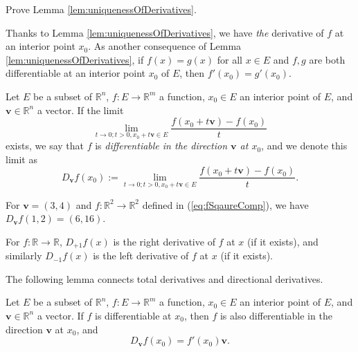 \begin{exc}
  Prove Lemma \ref{lem:uniquenessOfDerivatives}.
\end{exc}

\begin{rem}
  Thanks to Lemma \ref{lem:uniquenessOfDerivatives},
  we have \emph{the} derivative of $f$ at an interior point $x_0$.
  As another consequence of Lemma \ref{lem:uniquenessOfDerivatives},
  if $f(x)=g(x)$ for all $x\in E$
  and $f,g$ are both differentiable at an interior point $x_0$ of $E$,
  then $f'(x_0)=g'(x_0)$.
\end{rem}

\begin{defn}
  \label{def:directionalDerivative}
  Let $E$ be a subset of $\mathbb{R}^n$,
  $f: E\rightarrow \mathbb{R}^m$ a function,
  $x_0\in E$ an interior point of $E$,
  and $\mathbf{v}\in \mathbb{R}^n$ a vector.
  If the limit
  \begin{displaymath}
    \lim_{t\rightarrow 0; t>0, x_0+t\mathbf{v}\in E} \frac{f(x_0+t\mathbf{v}) - f(x_0)}{t}
  \end{displaymath}
  exists, we say that $f$ is \emph{differentiable in the direction $\mathbf{v}$
    at $x_0$},
  and we denote this limit as
  \begin{equation}
    \label{eq:directionalDerivative}
    D_\mathbf{v} f(x_0) := \lim_{t\rightarrow 0; t>0, x_0+t\mathbf{v}\in E}
    \frac{f(x_0+t\mathbf{v}) - f(x_0)}{t}.
  \end{equation}
\end{defn}

\begin{exm}
  For $\mathbf{v}=(3,4)$ and $f: \mathbb{R}^2\rightarrow\mathbb{R}^2$ defined in
  (\ref{eq:fSqaureComp}),
  we have $D_{\mathbf{v}}f(1,2)=(6,16)$.
\end{exm}

\begin{exm}
  For $f: \mathbb{R}\rightarrow\mathbb{R}$,
  $D_{+1} f(x)$ is the right derivative of $f$ at $x$ (if it exists),
  and similarly $D_{-1}f(x)$ is the left derivative of $f$ at $x$ (if it exists).
\end{exm}

\begin{rem}
  The following lemma connects total derivatives and directional derivatives.
\end{rem}

\begin{lem}
  \label{lem:totalDiffImpliesDirectionalDiff}
  Let $E$ be a subset of $\mathbb{R}^n$,
  $f: E\rightarrow \mathbb{R}^m$ a function,
  $x_0\in E$ an interior point of $E$,
  and $\mathbf{v}\in \mathbb{R}^n$ a vector.
  If $f$ is differentiable at $x_0$,
  then $f$ is also differentiable in the direction $\mathbf{v}$ at $x_0$, and
  \begin{equation}
    \label{eq:totalDiffImpliesDirectionalDiff}
    D_\mathbf{v} f(x_0) = f'(x_0) \mathbf{v}.
  \end{equation}
\end{lem}

